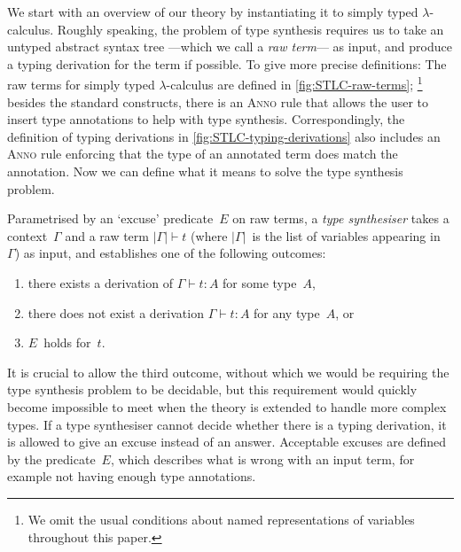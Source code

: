We start with an overview of our theory by instantiating it to simply typed $\lambda$-calculus.
Roughly speaking, the problem of type synthesis requires us to take an untyped abstract syntax tree ---which we call a \emph{raw term}--- as input, and produce a typing derivation for the term if possible.
To give more precise definitions:
The raw terms for simply typed $\lambda$-calculus are defined in \cref{fig:STLC-raw-terms};%
\footnote{We omit the usual conditions about named representations of variables throughout this paper.}
besides the standard constructs, there is an \textsc{Anno} rule that allows the user to insert type annotations to help with type synthesis.
Correspondingly, the definition of typing derivations in \cref{fig:STLC-typing-derivations} also includes an \textsc{Anno} rule enforcing that the type of an annotated term does match the annotation.
Now we can define what it means to solve the type synthesis problem.

\begin{definition}
\label{def:STLC-type-synthesiser}
Parametrised by an `excuse' predicate~$E$ on raw terms, a \emph{type synthesiser} takes a context~$\Gamma$ and a raw term $|\Gamma| \vdash t$ (where $|\Gamma|$~is the list of variables appearing in~$\Gamma$) as input, and establishes one of the following outcomes:
\begin{enumerate}
\item there exists a derivation of $\Gamma \vdash t : A$ for some type~$A$,
\item there does not exist a derivation $\Gamma \vdash t : A$ for any type~$A$, or
\item $E$~holds for~$t$.
\end{enumerate}
\end{definition}

It is crucial to allow the third outcome, without which we would be requiring the type synthesis problem to be decidable, but this requirement would quickly become impossible to meet when the theory is extended to handle more complex types.
If a type synthesiser cannot decide whether there is a typing derivation, it is allowed to give an excuse instead of an answer.
Acceptable excuses are defined by the predicate~$E$, which describes what is wrong with an input term, for example not having enough type annotations.


